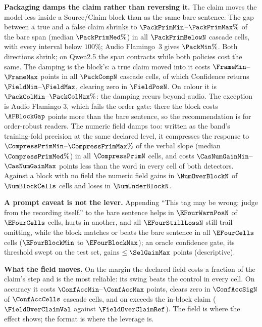 \noindent\textbf{Packaging damps the claim rather than reversing it.} The claim moves the model
less inside a Source/Claim block than as the same bare sentence. The gap
between a true and a false claim shrinks to $\PackPrimMin$--$\PackPrimMax\%$ of the bare span (median
$\PackPrimMed\%$) in all $\PackPrimBelowN$ cascade cells, with every interval below $100\%$;
Audio Flamingo~3 gives $\PackMin\%$. Both directions shrink; on Qwen2.5 the span contracts while both policies cost the same. The damping is the block's: a true claim moved into it costs $\FrameMin$--$\FrameMax$ points in all
$\PackCompN$ cascade cells, of which Confidence returns $\FieldMin$--$\FieldMax$, clearing zero in $\FieldPosN$.
On colour it is $\PackColMin$--$\PackColMax\%$: the damping recurs beyond audio. The exception is Audio Flamingo 3, which fails the order gate: there the block costs $\AFBlockGap$
points more than the bare sentence, so the recommendation is for order-robust readers.  The numeric field damps too: written as the band's training-fold precision at the same declared
level, it compresses the response
to $\CompressPrimMin$--$\CompressPrimMax\%$ of the verbal slope (median $\CompressPrimMed\%$) in all
$\CompressPrimN$ cells, and costs $\CasNumGainMin$--$\CasNumGainMax$ points less than the word in every cell of both
detectors. Against a block with no field the numeric field gains in $\NumOverBlockN$ of $\NumBlockCells$ cells and loses in
$\NumUnderBlockN$.

\begin{sloppypar}
\noindent\textbf{A prompt caveat is not the lever.} Appending ``{\ttfamily\small This tag may be wrong; judge
from the recording itself.}'' to the bare sentence helps in $\EFourWarnPosN$ of $\EFourCells$
cells, hurts in another, and all $\EFourStillLossN$ still trail omitting, while the block
matches or beats the bare sentence in all $\EFourCells$ cells ($\EFourBlockMin$ to $\EFourBlockMax$); an oracle
confidence gate, its threshold swept on the test set, gains $\le\SelGainMax$ points (descriptive).
\end{sloppypar}

\noindent\textbf{What the field moves.} On the margin the declared field costs a fraction of the claim's step and is the
most reliable: its swing beats the control in every cell. On accuracy it costs $\ConfAccMin$--$\ConfAccMax$ points, clears zero in $\ConfAccSigN$ of $\ConfAccCells$ cascade
cells, and on \FieldOverClaimCell{} exceeds the in-block claim ($\FieldOverClaimVal$ against $\FieldOverClaimRef$). The field is where the effect shows; the format is where the leverage is.


